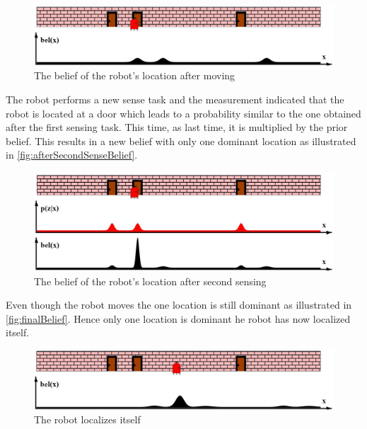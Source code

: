\begin{figure}[H]
\centering
\includegraphics[scale=0.36]{images/MarkovLocalizationC}
\caption{The belief of the robot's location after moving}
\label{fig:afterMoveBelief}
\end{figure}

The robot performs a new sense task and the measurement indicated that the robot is located at a door which leads to a probability similar to the one obtained after the first sensing task. This time, as last time, it is multiplied by the prior belief. This results in a new belief with only one dominant location as illustrated in \autoref{fig:afterSecondSenseBelief}. 

\begin{figure}[H]
\centering
\includegraphics[scale=0.36]{images/MarkovLocalizationD}
\caption{The belief of the robot's location after second sensing}
\label{fig:afterSecondSenseBelief}
\end{figure}

Even though the robot moves the one location is still dominant as illustrated in \autoref{fig:finalBelief}. Hence only one location is dominant he robot has now localized itself.

\begin{figure}[H]
\centering
\includegraphics[scale=0.36]{images/MarkovLocalizationE}
\caption{The robot localizes itself}
\label{fig:finalBelief}
\end{figure}


